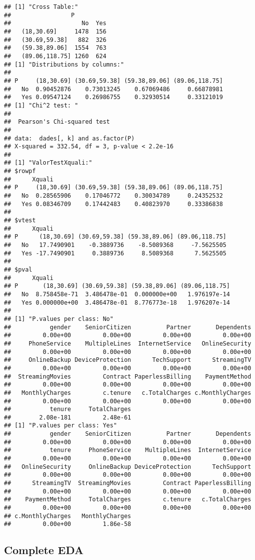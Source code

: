 \documentclass[
]{article}
\begin{document}
\begin{verbatim}
## [1] "Cross Table:"
##                 P
##                    No  Yes
##   (18,30.69]     1478  156
##   (30.69,59.38]   882  326
##   (59.38,89.06]  1554  763
##   (89.06,118.75] 1260  624
## [1] "Distributions by columns:"
##      
## P     (18,30.69] (30.69,59.38] (59.38,89.06] (89.06,118.75]
##   No  0.90452876    0.73013245    0.67069486     0.66878981
##   Yes 0.09547124    0.26986755    0.32930514     0.33121019
## [1] "Chi^2 test: "
## 
##  Pearson's Chi-squared test
## 
## data:  dades[, k] and as.factor(P)
## X-squared = 332.54, df = 3, p-value < 2.2e-16
## 
## [1] "ValorTestXquali:"
## $rowpf
##      Xquali
## P     (18,30.69] (30.69,59.38] (59.38,89.06] (89.06,118.75]
##   No  0.28565906    0.17046772    0.30034789     0.24352532
##   Yes 0.08346709    0.17442483    0.40823970     0.33386838
## 
## $vtest
##      Xquali
## P      (18,30.69] (30.69,59.38] (59.38,89.06] (89.06,118.75]
##   No   17.7490901    -0.3889736    -8.5089368     -7.5625505
##   Yes -17.7490901     0.3889736     8.5089368      7.5625505
## 
## $pval
##      Xquali
## P       (18,30.69] (30.69,59.38] (59.38,89.06] (89.06,118.75]
##   No  8.758458e-71  3.486478e-01  0.000000e+00   1.976197e-14
##   Yes 0.000000e+00  3.486478e-01  8.776773e-18   1.976207e-14
## 
## [1] "P.values per class: No"
##           gender    SeniorCitizen          Partner       Dependents 
##         0.00e+00         0.00e+00         0.00e+00         0.00e+00 
##     PhoneService    MultipleLines  InternetService   OnlineSecurity 
##         0.00e+00         0.00e+00         0.00e+00         0.00e+00 
##     OnlineBackup DeviceProtection      TechSupport      StreamingTV 
##         0.00e+00         0.00e+00         0.00e+00         0.00e+00 
##  StreamingMovies         Contract PaperlessBilling    PaymentMethod 
##         0.00e+00         0.00e+00         0.00e+00         0.00e+00 
##   MonthlyCharges         c.tenure   c.TotalCharges c.MonthlyCharges 
##         0.00e+00         0.00e+00         0.00e+00         0.00e+00 
##           tenure     TotalCharges 
##        2.08e-181         2.48e-61 
## [1] "P.values per class: Yes"
##           gender    SeniorCitizen          Partner       Dependents 
##         0.00e+00         0.00e+00         0.00e+00         0.00e+00 
##           tenure     PhoneService    MultipleLines  InternetService 
##         0.00e+00         0.00e+00         0.00e+00         0.00e+00 
##   OnlineSecurity     OnlineBackup DeviceProtection      TechSupport 
##         0.00e+00         0.00e+00         0.00e+00         0.00e+00 
##      StreamingTV  StreamingMovies         Contract PaperlessBilling 
##         0.00e+00         0.00e+00         0.00e+00         0.00e+00 
##    PaymentMethod     TotalCharges         c.tenure   c.TotalCharges 
##         0.00e+00         0.00e+00         0.00e+00         0.00e+00 
## c.MonthlyCharges   MonthlyCharges 
##         0.00e+00         1.86e-58
\end{verbatim}

\newpage

\hypertarget{complete-eda}{%
\subsection{Complete EDA}\label{complete-eda}}
\end{document}

